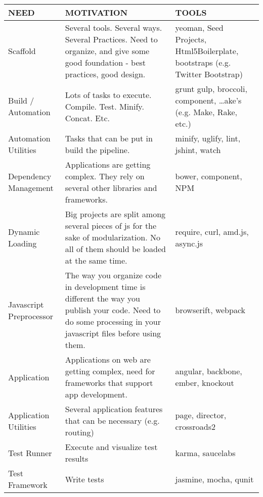 \documentclass[]{amsart}
\begin{document}
\begin{table}
\tiny
\begin{center}
  \begin{tabularx}{\textwidth}{p{2cm} p{5cm} p{5cm}}
  NEED & MOTIVATION & TOOLS\\
    \hline      
    Scaffold & 
    Several tools. Several ways. Several Practices. Need to organize, and give some good foundation - best practices, good design. & 
    yeoman, Seed Projects, Html5Boilerplate, bootstraps (e.g. Twitter Bootstrap) \\
  
    Build / Automation & 
    Lots of tasks to execute. Compile. Test. Minify. Concat. Etc. & 
    grunt gulp, broccoli, component, …ake's (e.g. Make, Rake, etc.) \\
  
    Automation Utilities & 
    Tasks that can be put in build the pipeline. & 
    minify, uglify, lint, jshint, watch \\
  
    Dependency Management & 
    Applications are getting complex. They rely on several other libraries and frameworks. & 
    bower, component, NPM \\
  
    Dynamic Loading & 
    Big projects are split among several pieces of js for the sake of modularization. No all of them should be loaded at the same time. & 
    require, curl, amd.js, async.js \\
  
    Javascript Preprocessor & 
    The way you organize code in development time is diﬀerent the way you publish your code. Need to do some processing in your javascript ﬁles before using them. & 
    browserift, webpack \\
  
    Application & 
    Applications on web are getting complex, need for frameworks that support app development. & 
    angular, backbone, ember, knockout \\
  
    Application Utilities & 
    Several application features that can be necessary (e.g. routing) & 
    page, director, crossroads2 \\
  
    Test Runner & 
    Execute and visualize test results & 
    karma, saucelabs \\
  
    Test Framework & 
    Write tests & 
    jasmine, mocha, qunit \\
  

\end{tabularx}
\end{center}
\end{table}
\end{document}
